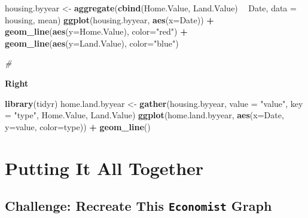 \documentclass[]{book}
\newenvironment{Shaded}{\begin{snugshade}}{\end{snugshade}}
\newcommand{\KeywordTok}[1]{\textcolor[rgb]{0.13,0.29,0.53}{\textbf{#1}}}
\newcommand{\DataTypeTok}[1]{\textcolor[rgb]{0.13,0.29,0.53}{#1}}
\newcommand{\StringTok}[1]{\textcolor[rgb]{0.31,0.60,0.02}{#1}}
\newcommand{\CommentTok}[1]{\textcolor[rgb]{0.56,0.35,0.01}{\textit{#1}}}
\newcommand{\OperatorTok}[1]{\textcolor[rgb]{0.81,0.36,0.00}{\textbf{#1}}}
\newcommand{\NormalTok}[1]{#1}
\begin{document}
\begin{Shaded}
\begin{Highlighting}[]
\NormalTok{housing.byyear <-}\StringTok{ }\KeywordTok{aggregate}\NormalTok{(}\KeywordTok{cbind}\NormalTok{(Home.Value, Land.Value) }\OperatorTok{~}\StringTok{ }\NormalTok{Date, }\DataTypeTok{data =}\NormalTok{ housing, mean)}
\KeywordTok{ggplot}\NormalTok{(housing.byyear,}
       \KeywordTok{aes}\NormalTok{(}\DataTypeTok{x=}\NormalTok{Date)) }\OperatorTok{+}
\StringTok{  }\KeywordTok{geom_line}\NormalTok{(}\KeywordTok{aes}\NormalTok{(}\DataTypeTok{y=}\NormalTok{Home.Value), }\DataTypeTok{color=}\StringTok{"red"}\NormalTok{) }\OperatorTok{+}
\StringTok{  }\KeywordTok{geom_line}\NormalTok{(}\KeywordTok{aes}\NormalTok{(}\DataTypeTok{y=}\NormalTok{Land.Value), }\DataTypeTok{color=}\StringTok{"blue"}\NormalTok{)}

\CommentTok{#}
\end{Highlighting}
\end{Shaded}

\textbf{Right}

\begin{Shaded}
\begin{Highlighting}[]
\KeywordTok{library}\NormalTok{(tidyr)}
\NormalTok{home.land.byyear <-}\StringTok{ }\KeywordTok{gather}\NormalTok{(housing.byyear,}
                           \DataTypeTok{value =} \StringTok{"value"}\NormalTok{,}
                           \DataTypeTok{key =} \StringTok{"type"}\NormalTok{,}
\NormalTok{                           Home.Value, Land.Value)}
\KeywordTok{ggplot}\NormalTok{(home.land.byyear,}
       \KeywordTok{aes}\NormalTok{(}\DataTypeTok{x=}\NormalTok{Date,}
           \DataTypeTok{y=}\NormalTok{value,}
           \DataTypeTok{color=}\NormalTok{type)) }\OperatorTok{+}
\StringTok{  }\KeywordTok{geom_line}\NormalTok{()}
\end{Highlighting}
\end{Shaded}

\section{Putting It All Together}\label{putting-it-all-together}

\subsection{\texorpdfstring{Challenge: Recreate This \texttt{Economist}
Graph}{Challenge: Recreate This Economist Graph}}\label{challenge-recreate-this-economist-graph}
\end{document}
